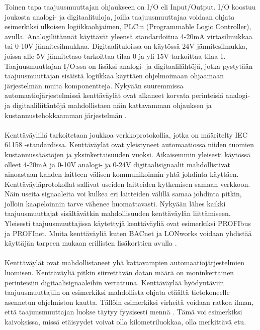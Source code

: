 \documentclass[finnish,12pt,a4paper,pdftex,elec,utf8]{aaltothesis}
\begin{document}
\noindent
Toinen tapa taajuusmuuttajan ohjaukseen on I/O eli Input/Output. I/O koostuu joukosta analogi- ja digitaalituloja, joilla taajuusmuuttajaa voidaan ohjata esimerkiksi ulkoisen logiikkaohjaimen, PLC:n (Programmable Logic Controller), avulla. Analogiliitännät käyttävät yleensä standardoitua 4-20mA virtasilmukkaa tai 0-10V jännitesilmukkaa. Digitaalituloissa on käytössä 24V jännitesilmukka, joissa alle 5V jännitetaso tarkoittaa tilaa 0 ja yli 15V tarkoittaa tilaa 1. Taajuusmuuttajan I/O:ssa on lisäksi analogi- ja digitaalilähtöjä, jotka pystytään taajuusmuuttajan sisäistä logiikkaa käyttäen ohjelmoimaan ohjaamaan järjestelmän muita komponentteja. Nykyään suuremmissa automaatiojärjestelmissä kenttäväylät ovat alkaneet korvata perinteisiä analogi- ja digitaaliliitäntöjä mahdollistaen näin kattavamman ohjauksen ja kustannustehokkaamman järjestelmän \cite{MyyntiHaastattelu}.
\\\\
Kenttäväylillä tarkoitetaan joukkoa verkkoprotokollia, jotka on määritelty IEC 61158 -standardissa. Kenttäväylät ovat yleistyneet automaatiossa niiden tuomien kustannussäästöjen ja yksinkertaisuuden vuoksi. Aikaisemmin yleisesti käytössä olleet 4-20mA ja 0-10V analogi- ja 0-24V digitaalisignaalit mahdollistivat ainoastaan kahden laitteen välisen kommunikoinnin yhtä johdinta käyttäen. Kenttäväyläprotokollat sallivat useiden laitteiden kytkemisen samaan verkkoon. Näin useita signaaleita voi kulkea eri laitteiden välillä samaa johdinta pitkin, jolloin kaapeloinnin tarve vähenee huomattavasti. Nykyään lähes kaikki taajuusmuuttajat sisältävätkin mahdollisuuden kenttäväylän liittämiseen. Yleisesti taajuusmuuttajissa käytettyjä kenttäväyliä ovat esimerkiksi PROFIbus ja PROFInet. Muita kenttäväyliä kuten BACnet ja LONworks voidaan yhdistää käyttäjän tarpeen mukaan erillisten lisäkorttien avulla \cite{880hwman}.
\\\\
Kenttäväylät ovat mahdollistaneet yhä kattavampien automaatiojärjestelmien luomisen. Kenttäväyliä pitkin siirrettävän datan määrä on moninkertainen perinteisiin digitaalisignaaleihin verrattuna. Kenttäväylää hyödyntäviin taajuusmuuttajiin on esimerkiksi mahdollista ohjata etäältä tietokoneelle asennetun ohjelmiston kautta. Tällöin esimerkiksi virheitä voidaan ratkoa ilman, että taajuusmuuttajan luokse täytyy fyysisesti mennä \cite{MyyntiHaastattelu}. Tämä voi esimerkiksi kaivoksissa, missä etäisyydet voivat olla kilometriluokkaa, olla merkittävä etu.
\\\\
\end{document}
